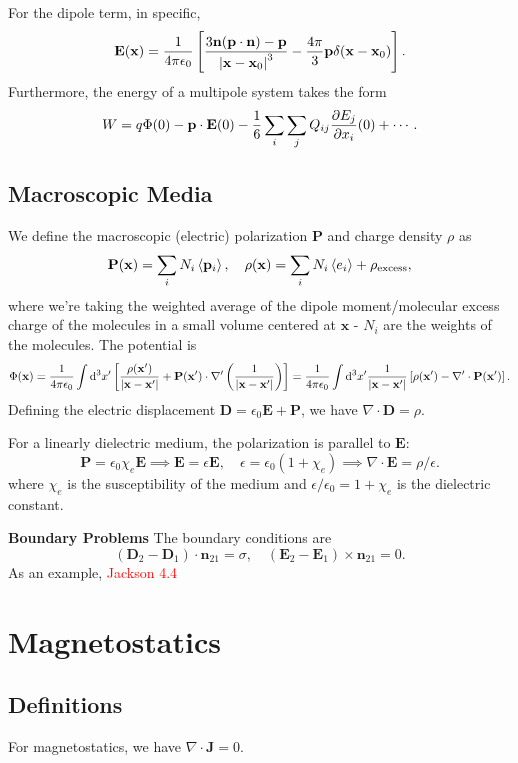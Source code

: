 \documentclass{article}
\begin{document}
For the dipole term, in specific, 
$$\mathbf E(\mathbf x)=\frac 1{4\pi\epsilon_0}\left[\frac{3\mathbf n(\mathbf p\cdot\mathbf n)-\mathbf p}{\left\lvert\mathbf x-\mathbf x_0\right\rvert^3}-\frac{4\pi}3\mathbf p\delta(\mathbf x-\mathbf x_0)\right].$$
Furthermore, the energy of a multipole system takes the form 
$$W=q\Phi(0)-\mathbf p\cdot\mathbf E(0)-\frac 16\sum_i\sum_jQ_{ij} \frac{\partial E_j}{\partial x_i}(0)+\cdots.$$

\subsection{Macroscopic Media}
We define the macroscopic (electric) polarization $\mathbf P$ and charge density $\rho$ as  
$$\mathbf P(\mathbf x)=\sum_iN_i\ev{\mathbf p_i},\quad \rho(\mathbf x)=\sum_iN_i\ev{e_i}+\rho_\text{excess},$$
where we're taking the weighted average of the dipole moment/molecular excess charge of the molecules in a small volume centered at $\mathbf x$ - $N_i$ are the weights of the molecules. The potential is 
$$\Phi(\mathbf x)=\frac 1{4\pi\epsilon_0}\int\dd^3x'\left[\frac{\rho(\mathbf x')}{\left\lvert\mathbf x-\mathbf x'\right\rvert}+\mathbf P(\mathbf x')\cdot\nabla'\left(\frac 1{\left\lvert\mathbf x-\mathbf x'\right\rvert}\right)\right]=\frac 1{4\pi\epsilon_0}\int\dd^3x'\frac 1{\left\lvert\mathbf x-\mathbf x'\right\rvert}\left[\rho(\mathbf x')-\nabla'\cdot\mathbf P(\mathbf x')\right].$$
Defining the electric displacement $\mathbf D=\epsilon_0\mathbf E+\mathbf P$, we have $\nabla\cdot\mathbf D=\rho$. 

For a linearly dielectric medium, the polarization is parallel to $\mathbf E$:
$$\mathbf P=\epsilon_0\chi_e\mathbf E\implies \mathbf E=\epsilon\mathbf E,\quad \epsilon=\epsilon_0(1+\chi_e)\implies\nabla\cdot\mathbf E=\rho/\epsilon.$$
where $\chi_e$ is the susceptibility of the medium and $\epsilon/\epsilon_0=1+\chi_e$ is the dielectric constant.

\textbf{Boundary Problems}
The boundary conditions are 
$$(\mathbf D_2-\mathbf D_1)\cdot\mathbf n_{21}=\sigma,\quad(\mathbf E_2-\mathbf E_1)\times\mathbf n_{21}=0.$$
As an example, \textcolor{red}{Jackson 4.4} 

\section{Magnetostatics}
\subsection{Definitions}
For magnetostatics, we have $\nabla\cdot\mathbf J=0$. 
\end{document}
